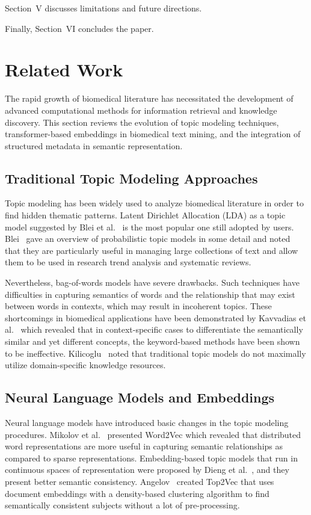 \documentclass{ieeeaccess}
\begin{document}
Section~V discusses limitations and future directions.  

Finally, Section~VI concludes the paper.

\section{Related Work}

The rapid growth of biomedical literature has necessitated the development of advanced computational methods for information retrieval and knowledge discovery. This section reviews the evolution of topic modeling techniques, transformer-based embeddings in biomedical text mining, and the integration of structured metadata in semantic representation.

\subsection{Traditional Topic Modeling Approaches}

Topic modeling has been widely used to analyze biomedical literature in order to find hidden thematic patterns. Latent Dirichlet Allocation (LDA) as a topic model suggested by Blei et al.~\cite{blei_latent_2003} is the most popular one still adopted by users. Blei~\cite{blei_probabilistic_2012} gave an overview of probabilistic topic models in some detail and noted that they are particularly useful in managing large collections of text and allow them to be used in research trend analysis and systematic reviews.

Nevertheless, bag-of-words models have severe drawbacks. Such techniques have difficulties in capturing semantics of words and the relationship that may exist between words in contexts, which may result in incoherent topics. These shortcomings in biomedical applications have been demonstrated by Kavvadias et al.~\cite{kavvadias_supporting_2020} which revealed that in context-specific cases to differentiate the semantically similar and yet different concepts, the keyword-based methods have been shown to be ineffective. Kilicoglu~\cite{kilicoglu_biomedical_2018} noted that traditional topic models do not maximally utilize domain-specific knowledge resources.

\subsection{Neural Language Models and Embeddings}

Neural language models have introduced basic changes in the topic modeling procedures. Mikolov et al.~\cite{mikolov_efficient_2013} presented Word2Vec which revealed that distributed word representations are more useful in capturing semantic relationships as compared to sparse representations. Embedding-based topic models that run in continuous spaces of representation were proposed by Dieng et al.~\cite{dieng_topic_2020}, and they present better semantic consistency. Angelov~\cite{angelov_top2vec_2020} created Top2Vec that uses document embeddings with a density-based clustering algorithm to find semantically consistent subjects without a lot of pre-processing.
\end{document}

